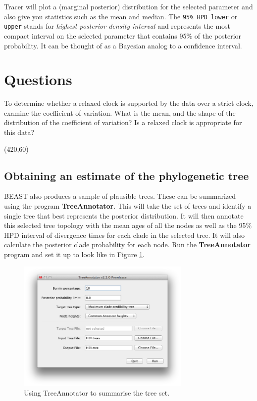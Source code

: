 \documentclass{article}
\begin{document}
Tracer will plot a (marginal posterior) distribution for the selected parameter and also give you statistics such as the mean and median. The \texttt{95\% HPD lower} or \texttt {upper} stands for {\it highest posterior density interval} and represents the most compact interval on the selected parameter that contains 95\% of the posterior probability. It can be thought of as a Bayesian analog to a confidence interval. 


\section*{Questions}

To determine whether a relaxed clock is supported by the data over a strict clock,
examine the coefficient of variation. What is the mean, and the shape of the distribution
of the coefficient of variation? Is a relaxed clock is appropriate for this data?

\vspace{5 mm}
\framebox(420,60){}
\vspace{5 mm}



\subsection*{Obtaining an estimate of the phylogenetic tree}

BEAST also produces a sample of plausible trees. 
These can be summarized using the program {\bf TreeAnnotator}. This will take the set of trees and identify a single tree that best represents the posterior distribution. It will then annotate this selected tree topology with the mean ages of all the
nodes as well as the 95\% HPD interval of divergence times for each clade in the selected tree. It will also calculate the posterior clade probability for each
node. Run the {\bf TreeAnnotator} program and set it up to look like in Figure \ref{fig.TreeAnnotator}.

\begin{figure}
\begin{center}

\includegraphics[width=0.75\textwidth]{figures/TreeAnnotator}

\end{center}
\caption{\label{fig.TreeAnnotator} Using TreeAnnotator to summarise the tree set.}
\end{figure}
\end{document}
